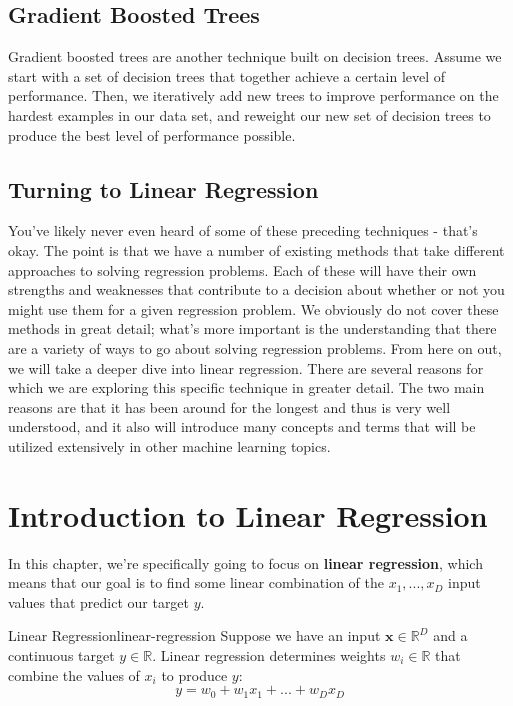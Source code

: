 \subsection{Gradient Boosted Trees}
Gradient boosted trees are another technique built on decision trees. Assume we start with a set of decision trees that together achieve a certain level of performance. Then, we iteratively add new trees to improve performance on the hardest examples in our data set, and reweight our new set of decision trees to produce the best level of performance possible.

\subsection{Turning to Linear Regression}
You've likely never even heard of some of these preceding techniques - that's okay. The point is that we have a number of existing methods that take different approaches to solving regression problems. Each of these will have their own strengths and weaknesses that contribute to a decision about whether or not you might use them for a given regression problem. We obviously do not cover these methods in great detail; what's more important is the understanding that there are a variety of ways to go about solving regression problems. From here on out, we will take a deeper dive into linear regression. There are several reasons for which we are exploring this specific technique in greater detail. The two main reasons are that it has been around for the longest and thus is very well understood, and it also will introduce many concepts and terms that will be utilized extensively in other machine learning topics.

\section{Introduction to Linear Regression}
In this chapter, we're specifically going to focus on \textbf{linear regression}, which means that our goal is to find some linear combination of the $x_{1}, ..., x_{D}$ input values that predict our target $y$.

\begin{definition}{Linear Regression}{linear-regression}
Suppose we have an input $\textbf{x}\in\mathbb{R}^D$ and a continuous target $y\in\mathbb{R}$.
Linear regression determines weights $w_{i}\in\mathbb{R}$ that combine the values of $x_{i}$ to produce $y$:
\begin{equation}
    y = w_{0} + w_{1}x_{1} + ... + w_{D}x_{D}
\end{equation}

\end{definition}

